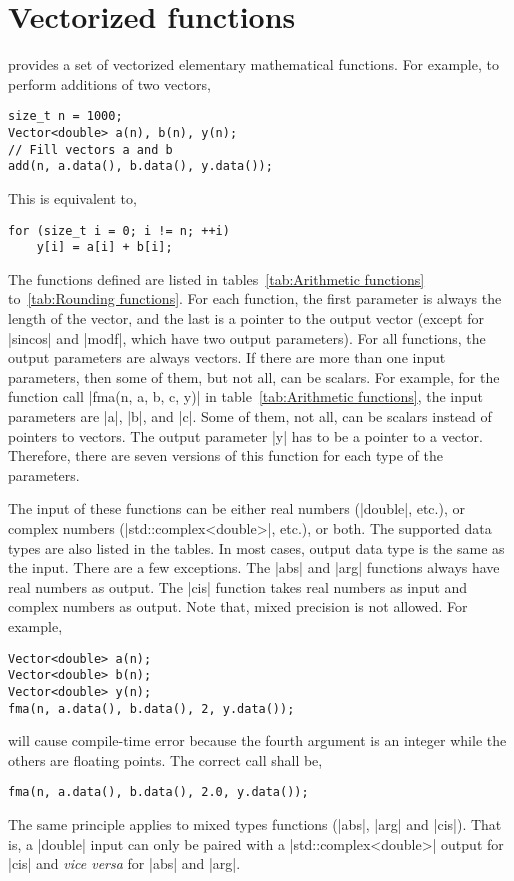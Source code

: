 \section{Vectorized functions}
\label{sec:Vectorized functions}

\mckl provides a set of vectorized elementary mathematical functions. For
example, to perform additions of two vectors,
\begin{verbatim}
size_t n = 1000;
Vector<double> a(n), b(n), y(n);
// Fill vectors a and b
add(n, a.data(), b.data(), y.data());
\end{verbatim}
This is equivalent to,
\begin{verbatim}
for (size_t i = 0; i != n; ++i)
    y[i] = a[i] + b[i];
\end{verbatim}
The functions defined are listed in tables~\ref{tab:Arithmetic functions}
to~\ref{tab:Rounding functions}. For each function, the first parameter is
always the length of the vector, and the last is a pointer to the output vector
(except for |sincos| and |modf|, which have two output parameters). For all
functions, the output parameters are always vectors. If there are more than one
input parameters, then some of them, but not all, can be scalars. For example,
for the function call |fma(n, a, b, c, y)| in table~\ref{tab:Arithmetic
functions}, the input parameters are |a|, |b|, and |c|. Some of them, not all,
can be scalars instead of pointers to vectors. The output parameter |y| has to
be a pointer to a vector. Therefore, there are seven versions of this function
for each type of the parameters.

The input of these functions  can be either real numbers (|double|, etc.), or
complex numbers (|std::complex<double>|, etc.), or both. The supported data
types are also listed in the tables. In most cases, output data type is the
same as the input. There are a few exceptions. The |abs| and |arg| functions
always have real numbers as output. The |cis| function takes real numbers as
input and complex numbers as output. Note that, mixed precision is not allowed.
For example,
\begin{verbatim}
Vector<double> a(n);
Vector<double> b(n);
Vector<double> y(n);
fma(n, a.data(), b.data(), 2, y.data());
\end{verbatim}
will cause compile-time error because the fourth argument is an integer while
the others are floating points. The correct call shall be,
\begin{verbatim}
fma(n, a.data(), b.data(), 2.0, y.data());
\end{verbatim}
The same principle applies to mixed types functions (|abs|, |arg| and |cis|).
That is, a |double| input can only be paired with a |std::complex<double>|
output for |cis| and \emph{vice versa} for |abs| and |arg|.


